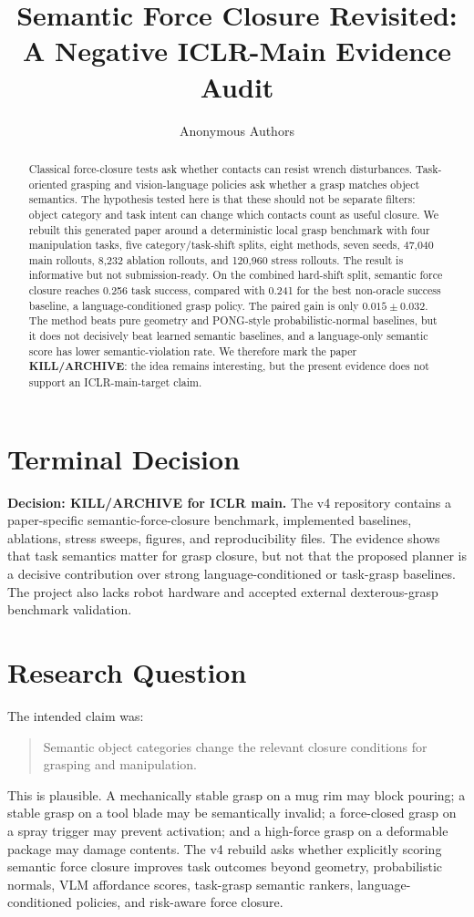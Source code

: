 \documentclass{article}
\title{Semantic Force Closure Revisited:\\A Negative ICLR-Main Evidence Audit}
\author{Anonymous Authors}
\begin{document}
\maketitle

\begin{abstract}
Classical force-closure tests ask whether contacts can resist wrench disturbances. Task-oriented grasping and vision-language policies ask whether a grasp matches object semantics. The hypothesis tested here is that these should not be separate filters: object category and task intent can change which contacts count as useful closure. We rebuilt this generated paper around a deterministic local grasp benchmark with four manipulation tasks, five category/task-shift splits, eight methods, seven seeds, 47,040 main rollouts, 8,232 ablation rollouts, and 120,960 stress rollouts. The result is informative but not submission-ready. On the combined hard-shift split, semantic force closure reaches 0.256 task success, compared with 0.241 for the best non-oracle success baseline, a language-conditioned grasp policy. The paired gain is only $0.015 \pm 0.032$. The method beats pure geometry and PONG-style probabilistic-normal baselines, but it does not decisively beat learned semantic baselines, and a language-only semantic score has lower semantic-violation rate. We therefore mark the paper \textbf{KILL/ARCHIVE}: the idea remains interesting, but the present evidence does not support an ICLR-main-target claim.
\end{abstract}

\section{Terminal Decision}
\textbf{Decision: KILL/ARCHIVE for ICLR main.} The v4 repository contains a paper-specific semantic-force-closure benchmark, implemented baselines, ablations, stress sweeps, figures, and reproducibility files. The evidence shows that task semantics matter for grasp closure, but not that the proposed planner is a decisive contribution over strong language-conditioned or task-grasp baselines. The project also lacks robot hardware and accepted external dexterous-grasp benchmark validation.

\section{Research Question}
The intended claim was:
\begin{quote}
Semantic object categories change the relevant closure conditions for grasping and manipulation.
\end{quote}
This is plausible. A mechanically stable grasp on a mug rim may block pouring; a stable grasp on a tool blade may be semantically invalid; a force-closed grasp on a spray trigger may prevent activation; and a high-force grasp on a deformable package may damage contents. The v4 rebuild asks whether explicitly scoring semantic force closure improves task outcomes beyond geometry, probabilistic normals, VLM affordance scores, task-grasp semantic rankers, language-conditioned policies, and risk-aware force closure.
\end{document}
